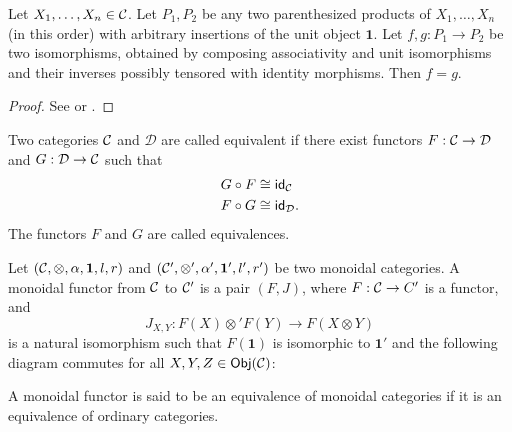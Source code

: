 	\begin{thm}
		Let $X_1,\dots,X_n\in{\mathcal{C}}$. Let $P_1,P_2$ be any two parenthesized products of $X_1,\dots,X_n$ (in this order) with arbitrary insertions of the unit object $\mathbf{1}$. Let 
		$f,g:P_1\to P_2$ be two isomorphisms, obtained by composing associativity and unit isomorphisms and their inverses possibly tensored with identity morphisms. Then $f=g$.
	\end{thm}
	\begin{proof}
		See \cite{MacLane1998} or \cite[Theorem 2.9.2]{Etingof2015}.
	\end{proof}

	\begin{defn}[Equivalence]
		Two categories ${\mathcal{C}}$ and $\mathcal{D}$ are called equivalent if there exist functors $F:{\mathcal{C}}\to\mathcal{D}$ and $G:\mathcal{D}\to{\mathcal{C}}$ such that
		\begin{align}
		G\circ F&\cong \mathsf{id}_{\mathcal{C}}\\
		F\circ G&\cong \mathsf{id}_\mathcal{D}.
		\end{align}
		The functors $F$ and $G$ are called equivalences. 
	\end{defn}

	\begin{defn}
		Let $({\mathcal{C}},\otimes,\alpha,\mathbf{1},l,r)$ and $({\mathcal{C}}',\otimes',\alpha',\mathbf{1}',l',r')$ be two monoidal categories. A monoidal functor from ${\mathcal{C}}$ to ${\mathcal{C}}'$ is a pair $(F,J)$, where $F:{\mathcal{C}}\to C'$ is a functor, and 
			\begin{equation}
				J_{X,Y}:F(X)\otimes'F(Y)\to F(X\otimes Y)
			\end{equation}
		is a natural isomorphism such that $F(\mathbf{1})$ is isomorphic to $\mathbf{1}'$ and the following diagram commutes for all $X,Y,Z\in\mathsf{Obj}({\mathcal{C}})$:
			\begin{figure}[H]
				\centering
			\end{figure}
		A monoidal functor is said to be an equivalence of monoidal categories if it is an equivalence of ordinary categories.
	\end{defn}


